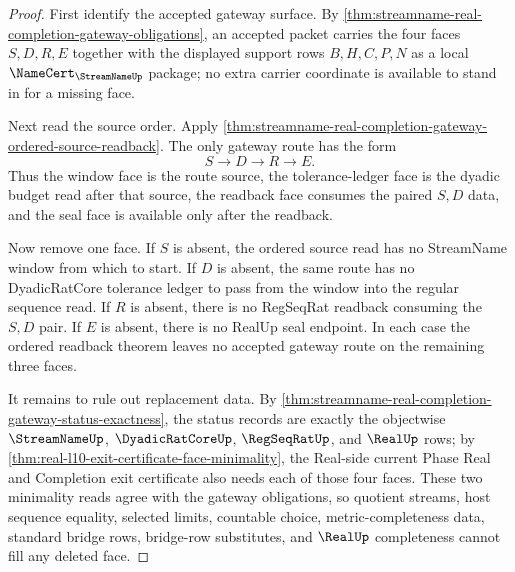 \begin{proof}
First identify the accepted gateway surface. By \autoref{thm:streamname-real-completion-gateway-obligations}, an accepted packet carries the four faces $S,D,R,E$ together with the displayed support rows $B,H,C,P,N$ as a local $\NameCert_{\StreamNameUp}$ package; no extra carrier coordinate is available to stand in for a missing face.

Next read the source order. Apply \autoref{thm:streamname-real-completion-gateway-ordered-source-readback}. The only gateway route has the form
$$
S \longrightarrow D \longrightarrow R \longrightarrow E .
$$
Thus the window face is the route source, the tolerance-ledger face is the dyadic budget read after that source, the readback face consumes the paired $S,D$ data, and the seal face is available only after the readback.

Now remove one face. If $S$ is absent, the ordered source read has no StreamName window from which to start. If $D$ is absent, the same route has no DyadicRatCore tolerance ledger to pass from the window into the regular sequence read. If $R$ is absent, there is no RegSeqRat readback consuming the $S,D$ pair. If $E$ is absent, there is no RealUp seal endpoint. In each case the ordered readback theorem leaves no accepted gateway route on the remaining three faces.

It remains to rule out replacement data. By \autoref{thm:streamname-real-completion-gateway-status-exactness}, the status records are exactly the objectwise $\StreamNameUp$, $\DyadicRatCoreUp$, $\RegSeqRatUp$, and $\RealUp$ rows; by \autoref{thm:real-l10-exit-certificate-face-minimality}, the Real-side current Phase Real and Completion exit certificate also needs each of those four faces. These two minimality reads agree with the gateway obligations, so quotient streams, host sequence equality, selected limits, countable choice, metric-completeness data, standard bridge rows, bridge-row substitutes, and $\RealUp$ completeness cannot fill any deleted face.
\end{proof}

